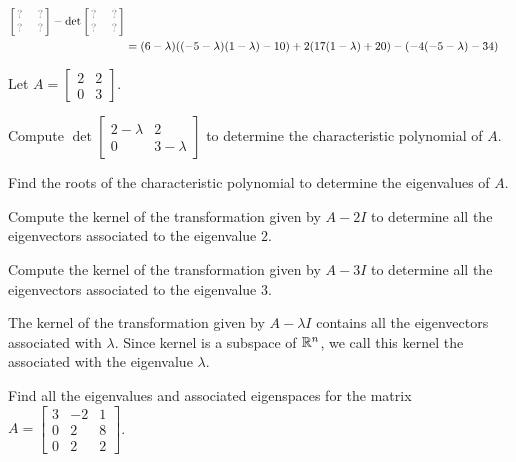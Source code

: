 \begin{applicationActivities}{3}{27}
\begin{activity}{15}
\begin{align*}
\begin{bmatrix}
      \unknown & \unknown \\
      \unknown & \unknown \\
    \end{bmatrix}
    -\det \begin{bmatrix}
      \unknown & \unknown \\
      \unknown & \unknown \\
    \end{bmatrix}
  \\ &=
    (6-\lambda)((-5-\lambda)(1-\lambda)-10)
    +2(17(1-\lambda)+20)
    -(-4(-5-\lambda)-34)
  \end{align*}
\end{activity}

\begin{activity}{15}
Let $A = \begin{bmatrix} 2 & 2 \\ 0 & 3 \end{bmatrix}$.
\begin{subactivity}
Compute $\det \begin{bmatrix} 2-\lambda & 2 \\ 0 & 3-\lambda \end{bmatrix}$ to determine the characteristic polynomial of $A$.
\end{subactivity}
\begin{subactivity}
Find the roots of the characteristic polynomial
to determine the eigenvalues of $A$.
\end{subactivity}
\begin{subactivity}
Compute the kernel of the transformation given by $A-2I$ to determine all the eigenvectors associated to the eigenvalue $2$.
\end{subactivity}
\begin{subactivity}
Compute the kernel of the transformation given by $A-3I$ to determine all the eigenvectors associated to the eigenvalue $3$.
\end{subactivity}
\end{activity}

\begin{definition}
  The kernel of the transformation given by \(A-\lambda I\) contains
  all the eigenvectors associated with \(\lambda\). Since kernel is a subspace
  of \(\mathbb{R}^n\), we call this kernel the  associated with the
  eigenvalue \(\lambda\).
\end{definition}


\begin{activity}{15}
  Find all the eigenvalues and associated eigenspaces for the matrix $A=\begin{bmatrix} 3 & -2 & 1 \\  0 & 2 & 8 \\ 0 & 2 & 2 \end{bmatrix}$.


\end{activity}
\end{applicationActivities}
